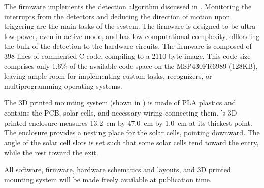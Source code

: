 The \sysname firmware implements the detection algorithm discussed in .
Monitoring the interrupts from the detectors and deducing the direction of motion upon triggering are the main tasks of the system.
The firmware is designed to be ultra-low power, even in active mode, and has low computational complexity, offloading the bulk of the detection to the hardware circuits.
The \sysname firmware is composed of 398 lines of commented C code, compiling to a 2110 byte image. This code size comprises only 1.6\% of the available code space on the MSP430FR6989 (128KB), leaving ample room for implementing custom tasks, recognizers, or multiprogramming operating systems.

The 3D printed mounting system (shown in ) is made of PLA plastics and contains the PCB, solar cells, and necessary wiring connecting them.
\sysname's 3D printed enclosure measures \SI{13.2}{\centi\meter} by \SI{47.0}{\centi\meter} by \SI{1.0}{\centi\meter} at its thickest point. The enclosure provides a nesting place for the solar cells, pointing downward.
The angle of the solar cell slots is set such that some solar cells tend toward the entry, while the rest toward the exit.

All software, firmware, hardware schematics and layouts, and 3D printed mounting system will be made freely available at publication time.
